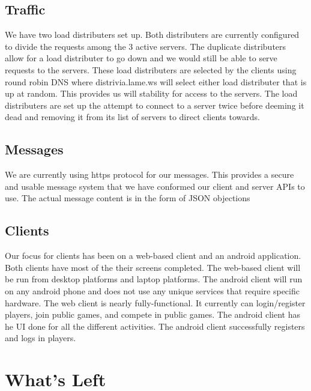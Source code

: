 \documentclass{dependencies/acm_proc_article-sp}
\begin{document}
\subsection {Traffic}
We have two load distributers set up. Both distributers are currently configured to
divide the requests among the 3 active servers. The duplicate distributers allow
for a load distributer to go down and we would still be able to serve requests
to the servers. These load distributers are selected by the clients using round
robin DNS where distrivia.lame.ws will select either load distributer that is
up at random. This provides us will stability for access to the servers. The
load distributers are set up the attempt to connect to a server twice before
deeming it dead and removing it from its list of servers to direct clients towards.
\subsection {Messages}
We are currently using https protocol for our messages. This provides a secure
and usable message system that we have conformed our client and server APIs to use.
The actual message content is in the form of JSON objections \cite{json} 
\subsection {Clients}
Our focus for clients has been on a web-based client and an android application.
Both clients have most of the their screens completed. The web-based client will
be run from desktop platforms and laptop platforms. The android client will run
on any android phone and does not use any unique services that require specific
hardware. The web client is nearly fully-functional. It currently can login/register
players, join public games, and compete in public games. The android client has
he UI done for all the different activities. The android client successfully registers
and logs in players.

\section {What's Left}
\end{document}
